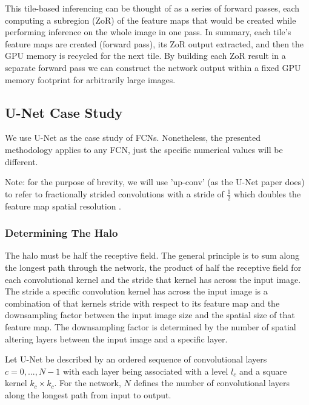 \documentclass[runningheads]{llncs}
\begin{document}
This tile-based inferencing can be thought of as a series of forward passes, each computing a subregion (ZoR) of the feature maps that would be created while performing inference on the whole image in one pass. 
In summary, each tile's feature maps are created (forward pass), its ZoR output extracted, and then the GPU memory is recycled for the next tile. By building each ZoR result in a separate forward pass we can construct the network output within a fixed GPU memory footprint for arbitrarily large images. 

\subsection{U-Net Case Study}

We use U-Net \cite{Ronneberger2015a} as the case study of FCNs. Nonetheless, the presented methodology applies to any FCN, just the specific numerical values will be different. 

Note: for the purpose of brevity, we will use 'up-conv' (as the U-Net paper does) to refer to fractionally strided convolutions with a stride of $\frac{1}{2}$ which doubles the feature map spatial resolution \cite{Dumoulin2018}.

\subsubsection{Determining The Halo}

The halo must be half the receptive field. 
The general principle is to sum along the longest path through the network, the product of half the receptive field for each convolutional kernel and the stride that kernel has across the input image. The stride a specific convolution kernel has across the input image is a combination of that kernels stride with respect to its feature map and the downsampling factor between the input image size and the spatial size of that feature map. The downsampling factor is determined by the number of spatial altering layers between the input image and a specific layer. 

Let U-Net be described by an ordered sequence of convolutional layers $c={0, ..., N-1}$ with each layer being associated with a level $l_{c}$ and a square kernel $k_{c} \times k_{c}$. 
For the network, $N$ defines the number of convolutional layers along the longest path from input to output. 
\end{document}
